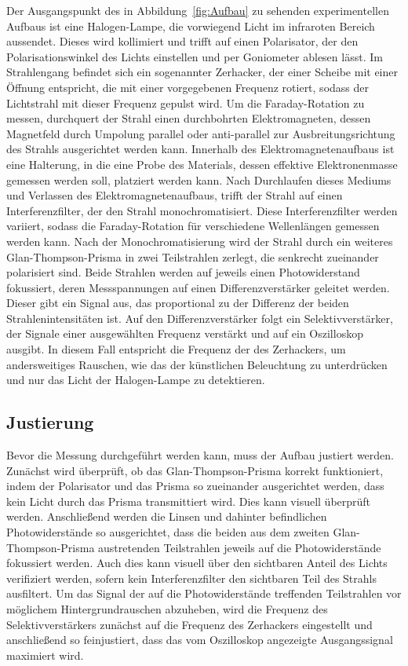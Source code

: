         \noindent
        Der Ausgangspunkt des in Abbildung~\ref{fig:Aufbau} zu sehenden experimentellen Aufbaus ist eine Halogen-Lampe, die vorwiegend Licht im infraroten Bereich aussendet. Dieses wird kollimiert und trifft auf einen Polarisator, der den Polarisationswinkel des Lichts einstellen und per Goniometer ablesen lässt. Im Strahlengang befindet sich ein sogenannter Zerhacker, der einer Scheibe mit einer Öffnung entspricht, die mit einer vorgegebenen Frequenz rotiert, sodass der Lichtstrahl mit dieser Frequenz gepulst wird. Um die Faraday-Rotation zu messen, durchquert der Strahl einen durchbohrten Elektromagneten, dessen Magnetfeld durch Umpolung parallel oder anti-parallel zur Ausbreitungsrichtung des Strahls ausgerichtet werden kann. Innerhalb des Elektromagnetenaufbaus ist eine Halterung, in die eine Probe des Materials, dessen effektive Elektronenmasse gemessen werden soll, platziert werden kann. Nach Durchlaufen dieses Mediums und Verlassen des Elektromagnetenaufbaus, trifft der Strahl auf einen Interferenzfilter, der den Strahl monochromatisiert. Diese Interferenzfilter werden variiert, sodass die Faraday-Rotation für verschiedene Wellenlängen gemessen werden kann. Nach der Monochromatisierung wird der Strahl durch ein weiteres Glan-Thompson-Prisma in zwei Teilstrahlen zerlegt, die senkrecht zueinander polarisiert sind. Beide Strahlen werden auf jeweils einen Photowiderstand fokussiert, deren Messspannungen auf einen Differenzverstärker geleitet werden. Dieser gibt ein Signal aus, das proportional zu der Differenz der beiden Strahlenintensitäten ist. Auf den Differenzverstärker folgt ein Selektivverstärker, der Signale einer ausgewählten Frequenz verstärkt und auf ein Oszilloskop ausgibt. In diesem Fall entspricht die Frequenz der des Zerhackers, um andersweitiges Rauschen, wie das der künstlichen Beleuchtung zu unterdrücken und nur das Licht der Halogen-Lampe zu detektieren.

    \subsection{Justierung}
        Bevor die Messung durchgeführt werden kann, muss der Aufbau justiert werden. Zunächst wird überprüft, ob das Glan-Thompson-Prisma korrekt funktioniert, indem der Polarisator und das Prisma so 
        zueinander ausgerichtet werden, dass kein Licht durch das Prisma transmittiert wird. Dies kann visuell überprüft werden. \newline
        Anschließend werden die Linsen und dahinter befindlichen Photowiderstände so ausgerichtet, dass die beiden aus dem zweiten Glan-Thompson-Prisma austretenden Teilstrahlen jeweils auf die Photowiderstände
        fokussiert werden. Auch dies kann visuell über den sichtbaren Anteil des Lichts verifiziert werden, sofern kein Interferenzfilter den sichtbaren Teil des Strahls ausfiltert. \newline
        Um das Signal der auf die Photowiderstände treffenden Teilstrahlen vor möglichem Hintergrundrauschen abzuheben, wird die Frequenz des Selektivverstärkers zunächst auf die Frequenz des Zerhackers eingestellt und anschließend so feinjustiert, dass das vom Oszilloskop angezeigte Ausgangssignal maximiert wird.  
